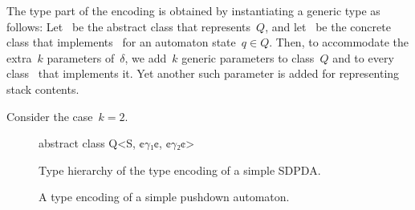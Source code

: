 The type part of the encoding is obtained by instantiating a generic type as follows:
Let~ be the abstract class that represents~$Q$, and let~ be the concrete class that
  implements~ for an automaton state~$q∈Q$.
Then, to accommodate the extra~$k$ parameters of~$δ$, we add~$k$ generic parameters
  to class~$Q$ and to every class~ that implements it.
Yet another such parameter is added for representing stack contents.

Consider the case~$k=2$.
\begin{figure}
  \begin{JAVA}
abstract class Q<S, ¢$γ₁$¢, ¢$γ₂$¢>
  \end{JAVA}
\end{figure}

\begin{figure}
  \caption{\label{Figure:SDPDA:hierarchy}%
    Type hierarchy of the type encoding of a simple SDPDA.
  }
  \begin{adjustbox}{}
    
  \end{adjustbox}
\end{figure}

\begin{figure}
  \caption{\label{Figure:SDPDA:example}%
    A type encoding of a simple pushdown automaton.
  }
\end{figure}

